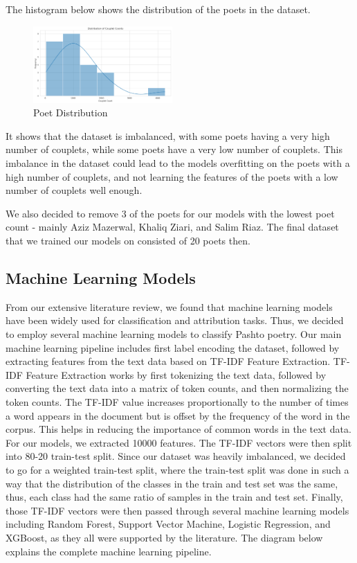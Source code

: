 The histogram below shows the distribution of the poets in the dataset.
\begin{figure}[H]
    \centering
    \includegraphics[width=0.475\textwidth]{poet_dist_hist.png}
    \caption{Poet Distribution}
    \label{fig:poet-dist-hist}
\end{figure}
It shows that the dataset is imbalanced, with some poets having a very high number of couplets, while some poets have a very low number of couplets. This imbalance in the dataset could lead to the models overfitting on the poets with a high number of couplets, and not learning the features of the poets with a low number of couplets well enough.

We also decided to remove 3 of the poets for our models with the lowest poet count - mainly Aziz Mazerwal, Khaliq Ziari, and Salim Riaz. The final dataset that we trained our models on consisted of 20 poets then. 

\subsection{Machine Learning Models}
From our extensive literature review, we found that machine learning models have been widely used for classification and attribution tasks. Thus, we decided to employ several machine learning models to classify Pashto poetry. Our main machine learning pipeline includes first label encoding the dataset, followed by extracting features from the text data based on TF-IDF Feature Extraction. TF-IDF Feature Extraction works by first tokenizing the text data, followed by converting the text data into a matrix of token counts, and then normalizing the token counts. The TF-IDF value increases proportionally to the number of times a word appears in the document but is offset by the frequency of the word in the corpus. This helps in reducing the importance of common words in the text data. For our models, we extracted 10000 features. The TF-IDF vectors were then split into 80-20 train-test split. Since our dataset was heavily imbalanced, we decided to go for a weighted train-test split, where the train-test split was done in such a way that the distribution of the classes in the train and test set was the same, thus, each class had the same ratio of samples in the train and test set. Finally, those TF-IDF vectors were then passed through several machine learning models including Random Forest, Support Vector Machine, Logistic Regression, and XGBoost, as they all were supported by the literature. The diagram below explains the complete machine learning pipeline.

